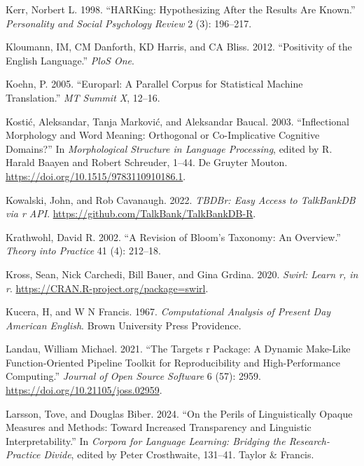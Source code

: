 \documentclass[
  letterpaper,
]{latex/krantz}
\newlength{\cslhangindent}
\newenvironment{CSLReferences}[2] %
 {\begin{list}{}{%
  \setlength{\itemindent}{0pt}
  \setlength{\leftmargin}{0pt}
  \setlength{\parsep}{0pt}
  \ifodd #1
   \setlength{\leftmargin}{\cslhangindent}
   \setlength{\itemindent}{-1\cslhangindent}
  \fi
  \setlength{\itemsep}{#2\baselineskip}}}
 {\end{list}}
\theoremstyle{definition}
\theoremstyle{remark}
\begin{document}
\begin{CSLReferences}{1}{0}
Kerr, Norbert L. 1998. {``HARKing: Hypothesizing After the Results Are
Known.''} \emph{Personality and Social Psychology Review} 2 (3):
196--217.

Kloumann, IM, CM Danforth, KD Harris, and CA Bliss. 2012. {``Positivity
of the English Language.''} \emph{PloS One}.

Koehn, P. 2005. {``Europarl: A Parallel Corpus for Statistical Machine
Translation.''} \emph{MT Summit X}, 12--16.

Kostić, Aleksandar, Tanja Marković, and Aleksandar Baucal. 2003.
{``Inflectional Morphology and Word Meaning: Orthogonal or
Co-Implicative Cognitive Domains?''} In \emph{Morphological Structure in
Language Processing}, edited by R. Harald Baayen and Robert Schreuder,
1--44. De Gruyter Mouton. \url{https://doi.org/10.1515/9783110910186.1}.

Kowalski, John, and Rob Cavanaugh. 2022. \emph{TBDBr: Easy Access to
TalkBankDB via r API}. \url{https://github.com/TalkBank/TalkBankDB-R}.

Krathwohl, David R. 2002. {``A Revision of Bloom's Taxonomy: An
Overview.''} \emph{Theory into Practice} 41 (4): 212--18.

Kross, Sean, Nick Carchedi, Bill Bauer, and Gina Grdina. 2020.
\emph{Swirl: Learn r, in r}.
\url{https://CRAN.R-project.org/package=swirl}.

Kucera, H, and W N Francis. 1967. \emph{Computational Analysis of
Present Day American English}. Brown University Press Providence.

Landau, William Michael. 2021. {``The Targets r Package: A Dynamic
Make-Like Function-Oriented Pipeline Toolkit for Reproducibility and
High-Performance Computing.''} \emph{Journal of Open Source Software} 6
(57): 2959. \url{https://doi.org/10.21105/joss.02959}.

Larsson, Tove, and Douglas Biber. 2024. {``On the Perils of
Linguistically Opaque Measures and Methods: Toward Increased
Transparency and Linguistic Interpretability.''} In \emph{Corpora for
Language Learning: Bridging the Research-Practice Divide}, edited by
Peter Crosthwaite, 131--41. Taylor \& Francis.


\end{CSLReferences}
\end{document}
